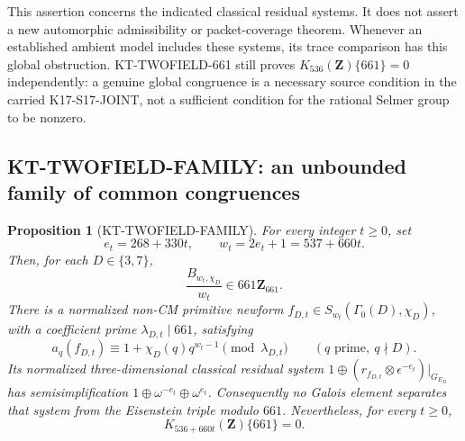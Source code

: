 \documentclass[11pt,a4paper]{article}
\newtheorem{proposition}[theorem]{Proposition}
\theoremstyle{definition}
\begin{document}
This assertion concerns the indicated classical residual
systems. It does not assert a new automorphic admissibility
or packet-coverage theorem. Whenever an established ambient
model includes these systems, its trace comparison has
this global obstruction. KT-TWOFIELD-661 still proves
$K_{536}(\mathbf Z)\{661\}=0$ independently: a genuine
global congruence is a necessary source condition in
the carried K17-S17-JOINT, not a sufficient condition for the
rational Selmer group to be nonzero.




\subsection{KT-TWOFIELD-FAMILY: an unbounded family of common congruences}
\label{sec:kt-twofield-family}

\begin{proposition}[KT-TWOFIELD-FAMILY]
For every integer $t\geq0$, set
\[
            e_t=268+330t,\qquad w_t=2e_t+1=537+660t.
                                                               \tag{TI.1}
\]
Then, for each $D\in\{3,7\}$,
\[
        \frac{B_{w_t,\chi_D}}{w_t}\in661\mathbf Z_{661}.
                                                               \tag{TI.2}
\]
There is a normalized non-CM primitive newform
$f_{D,t}\in S_{w_t}(\Gamma_0(D),\chi_D)$, with a
coefficient prime $\lambda_{D,t}\mid661$, satisfying
\[
 a_q(f_{D,t})\equiv1+\chi_D(q)q^{w_t-1}
          \pmod{\lambda_{D,t}}
                 \qquad(q\text{ prime},\ q\nmid D).
                                                               \tag{TI.3}
\]
Its normalized three-dimensional classical residual system
$1\oplus(r_{f_{D,t}}\otimes\epsilon^{-e_t})|_{G_{E_D}}$
has semisimplification
$1\oplus\omega^{-e_t}\oplus\omega^{e_t}$.
Consequently no Galois element separates that system from
the Eisenstein triple modulo $661$.
Nevertheless, for every $t\geq0$,
\[
                    K_{536+660t}(\mathbf Z)\{661\}=0.
                                                               \tag{TI.5}
\]
\end{proposition}
\end{document}
